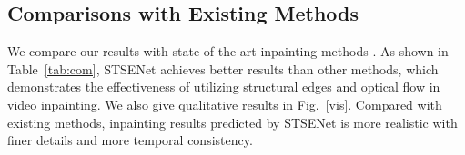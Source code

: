 \subsection{Comparisons with Existing Methods}
We compare our results with state-of-the-art inpainting methods \cite{nazeri2019edgeconnect,wang2019video,Xu_2019_CVPR,Kim_2019_CVPR1}. 
As shown in Table~\ref{tab:com}, STSENet achieves better results than other methods, which demonstrates the effectiveness of utilizing structural edges and optical flow in video inpainting.
We also give qualitative results in Fig.~\ref{vis}. Compared with existing methods, inpainting results predicted by STSENet is more realistic with finer details and more temporal consistency.
\begin{table}[t]
	\caption{Comparisons with existing methods.}\smallskip
	
	\centering
	\label{tab:com}
\end{table}


 
